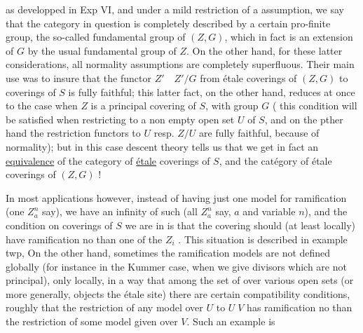 as developped in Exp VI, and under a mild restriction  of a  assumption, we  say that the category in question is  completely described by a certain pro-finite group, the so-called fundamental group of $(Z,G)$, which in fact is an extension of $G$ by the usual fundamental group of $Z$. On the other hand, for these latter considerations, all normality assumptions are completely superfluous. Their main use was to insure that the functor $Z'\quad Z'/G$ from étale coverings of $(Z,G)$ to coverings of $S$ is fully faithful; this latter fact, on the other hand, reduces at once to the case when $Z$ is a principal covering of $S$, with group $G$ ( this condition will be satisfied when restricting to a non empty open set $U$ of $S$, and on the pther hand the restriction functors  to $U$ resp. $Z/U$ are fully faithful, because of normality); but in this case descent theory tells us that we get in fact an \uline{equivalence} of the category of \uline{étale} coverings of $S$, and the catégory of étale coverings of $(Z,G)$ !

In most applications however, instead of having just one model for ramification (one $Z_a^n$ say), we have an infinity of such (all $Z_a^n$ say,  $a$ and variable $n$), and the condition on coverings  of $S$ we are  in is that the covering should (at least locally) have ramification no  than one of the $Z_i$ . This situation is described in example twp, On the other hand, sometimes the ramification models are not defined globally (for instance in the Kummer case, when we give  divisors which are not principal), only locally, in a way that among the set of   over various open sets (or more generally, objects  the étale site) there are certain compatibility conditions, roughly that the restriction of any model over $U$ to $U\;V$ has ramification no  than the restriction of some model given over $V$. Such an example is
